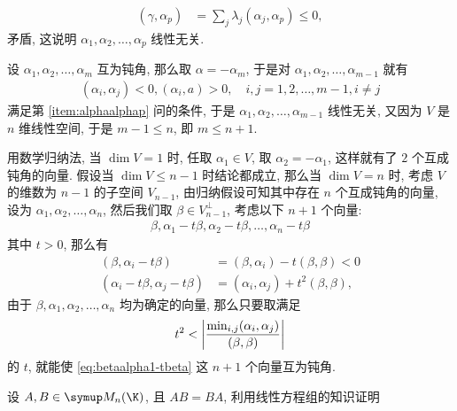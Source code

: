 \begin{exercise}[series=exer]
\begin{answer}
\begin{answersheet}
\begin{align*}
              (\gamma, \alpha_{p}) & = \sum_{j}\lambda_{j}(\alpha_{j}, \alpha_{p}) \le 0,
          \end{align*}
          矛盾, 这说明 $ \alpha_{1}, \alpha_{2}, \dots, \alpha_{p} $ 线性无关.
          \item 设 $ \alpha_{1}, \alpha_{2}, \dots, \alpha_{m} $ 互为钝角, 那么取 $ \alpha = -\alpha_{m} $, 于是对 $ \alpha_{1}, \alpha_{2}, \dots, \alpha_{m - 1} $ 就有
          \begin{align*}
              (\alpha_{i}, \alpha_{j}) < 0, (\alpha_{i}, a) > 0, \quad i, j = 1, 2, \dots, m - 1, i \ne j
          \end{align*}
          满足第 \ref{item:alphaalphap} 问的条件, 于是 $ \alpha_{1}, \alpha_{2}, \dots, \alpha_{m - 1} $ 线性无关, 又因为 $ V $ 是 $ n $ 维线性空间, 于是 $ m - 1 \le n $, 即 $ m \le n + 1 $.
          \item 用数学归纳法, 当 $ \dim V = 1 $ 时, 任取 $ \alpha_{1} \in V $, 取 $ \alpha_{2} = -\alpha_{1} $, 这样就有了 $ 2 $ 个互成钝角的向量. 假设当 $ \dim V \le n - 1 $ 时结论都成立, 那么当 $ \dim V = n $ 时, 考虑 $ V $ 的维数为 $ n - 1 $ 的子空间 $ V_{n - 1} $, 由归纳假设可知其中存在 $ n $ 个互成钝角的向量, 设为 $ \alpha_{1}, \alpha_{2}, \dots, \alpha_{n} $, 然后我们取 $ \beta \in V_{n - 1}^{\bot} $, 考虑以下 $ n + 1 $ 个向量:
          \begin{align}\label{eq:betaalpha1-tbeta}
              \beta, \alpha_{1} - t\beta, \alpha_{2} - t\beta, \dots, \alpha_{n} - t\beta
          \end{align}
          其中 $ t > 0 $, 那么有
          \begin{align*}
              (\beta, \alpha_{i} - t\beta) & = (\beta, \alpha_{i}) - t(\beta, \beta) < 0\\
              (\alpha_{i} - t\beta, \alpha_{j} - t\beta) & = (\alpha_{i}, \alpha_{j}) + t^{2}(\beta, \beta),
          \end{align*}
          由于 $ \beta, \alpha_{1}, \alpha_{2}, \dots, \alpha_{n} $ 均为确定的向量, 那么只要取满足
          \begin{align*}
              t^{2} < \abs{\frac{\min_{i, j}(\alpha_{i}, \alpha_{j})}{(\beta, \beta)}}
          \end{align*}
          的 $ t $, 就能使 \eqref{eq:betaalpha1-tbeta} 这 $ n + 1 $ 个向量互为钝角.
      \end{answersheet}
  \end{answer}
  \item 设 $ A, B \in \MM[\K] $, 且 $ AB = BA $, 利用线性方程组的知识证明

\end{exercise}

